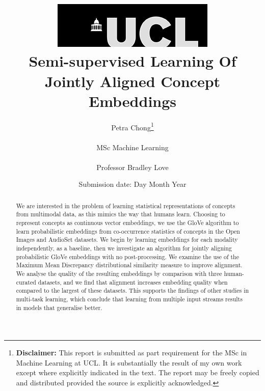 \documentclass[12pt]{report}
\begin{document}
\title{  	{ \includegraphics[scale=.5]{ucl_logo.png}}\\
{{\Huge Semi-supervised Learning Of Jointly Aligned Concept Embeddings}}\\
		}
\date{Submission date: Day Month Year}
\author{Petra Chong\thanks{
{\bf Disclaimer:}
This report is submitted as part requirement for the MSc in Machine Learning at UCL. It is
substantially the result of my own work except where explicitly indicated in the text.
The report may be freely copied and distributed provided the source is explicitly acknowledged.
}
\\ \\
MSc Machine Learning\\ \\
Professor Bradley Love}

 
\onehalfspacing
\maketitle
\begin{abstract}
We are interested in the problem of learning statistical representations of concepts from multimodal data, as this mimics the way that humans learn. Choosing to represent concepts as continuous vector embeddings, we use the GloVe algorithm to learn probabilistic embeddings from co-occurrence statistics of concepts in the Open Images and AudioSet datasets. We begin by learning embeddings for each modality independently, as a baseline, then we investigate an algorithm for jointly aligning probabilistic GloVe embeddings with no post-processing. We examine the use of the Maximum Mean Discrepancy distributional similarity measure to improve alignment. We analyse the quality of the resulting embeddings by comparison with three human-curated datasets, and we find that alignment increases embedding quality when compared to the largest of these datasets. This supports the findings of other studies in multi-task learning, which conclude that learning from multiple input streams results in models that generalise better. 
\end{abstract}

%
\tableofcontents
\setcounter{page}{1}

%











%

\appendix




%
%

\printbibliography
\end{document}
